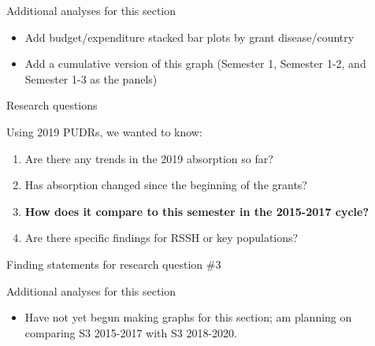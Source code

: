 \documentclass[ignorenonframetext,]{beamer}
\providecommand{\tightlist}{%
  \setlength{\itemsep}{0pt}\setlength{\parskip}{0pt}}
\begin{document}
\begin{frame}{Additional analyses for this section}
\protect\hypertarget{additional-analyses-for-this-section}{}

\begin{itemize}
\tightlist
\item
  Add budget/expenditure stacked bar plots by grant disease/country
\item
  Add a cumulative version of this graph (Semester 1, Semester 1-2, and
  Semester 1-3 as the panels)
\end{itemize}

\end{frame}

\begin{frame}{Research questions}
\protect\hypertarget{research-questions-3}{}

Using 2019 PUDRs, we wanted to know:

\begin{enumerate}
\tightlist
\item
  Are there any trends in the 2019 absorption so far?
\item
  Has absorption changed since the beginning of the grants?
\item
  \textbf{How does it compare to this semester in the 2015-2017 cycle?}
\item
  Are there specific findings for RSSH or key populations?
\end{enumerate}

\end{frame}

\begin{frame}{Finding statements for research question \#3}
\protect\hypertarget{finding-statements-for-research-question-3}{}

\end{frame}

\begin{frame}{Additional analyses for this section}
\protect\hypertarget{additional-analyses-for-this-section-1}{}

\begin{itemize}
\tightlist
\item
  Have not yet begun making graphs for this section; am planning on
  comparing S3 2015-2017 with S3 2018-2020.
\end{itemize}

\end{frame}
\end{document}
